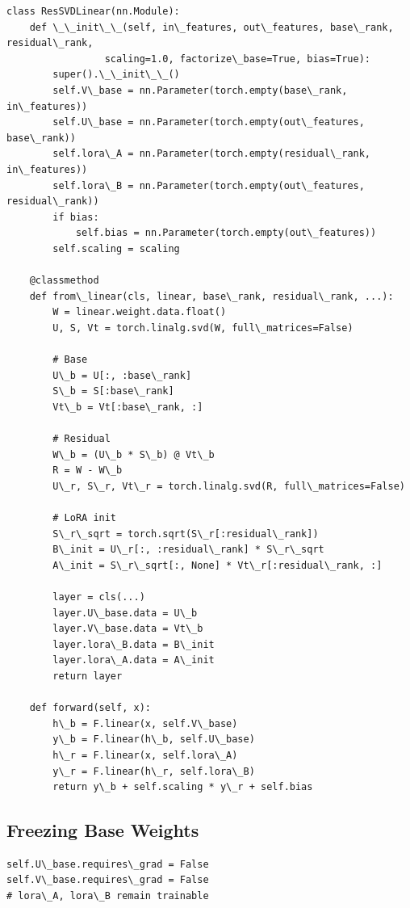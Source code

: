 \begin{lstlisting}
class ResSVDLinear(nn.Module):
    def \_\_init\_\_(self, in\_features, out\_features, base\_rank, residual\_rank,
                 scaling=1.0, factorize\_base=True, bias=True):
        super().\_\_init\_\_()
        self.V\_base = nn.Parameter(torch.empty(base\_rank, in\_features))
        self.U\_base = nn.Parameter(torch.empty(out\_features, base\_rank))
        self.lora\_A = nn.Parameter(torch.empty(residual\_rank, in\_features))
        self.lora\_B = nn.Parameter(torch.empty(out\_features, residual\_rank))
        if bias:
            self.bias = nn.Parameter(torch.empty(out\_features))
        self.scaling = scaling
    
    @classmethod
    def from\_linear(cls, linear, base\_rank, residual\_rank, ...):
        W = linear.weight.data.float()
        U, S, Vt = torch.linalg.svd(W, full\_matrices=False)
        
        # Base
        U\_b = U[:, :base\_rank]
        S\_b = S[:base\_rank]
        Vt\_b = Vt[:base\_rank, :]
        
        # Residual
        W\_b = (U\_b * S\_b) @ Vt\_b
        R = W - W\_b
        U\_r, S\_r, Vt\_r = torch.linalg.svd(R, full\_matrices=False)
        
        # LoRA init
        S\_r\_sqrt = torch.sqrt(S\_r[:residual\_rank])
        B\_init = U\_r[:, :residual\_rank] * S\_r\_sqrt
        A\_init = S\_r\_sqrt[:, None] * Vt\_r[:residual\_rank, :]
        
        layer = cls(...)
        layer.U\_base.data = U\_b
        layer.V\_base.data = Vt\_b
        layer.lora\_B.data = B\_init
        layer.lora\_A.data = A\_init
        return layer
    
    def forward(self, x):
        h\_b = F.linear(x, self.V\_base)
        y\_b = F.linear(h\_b, self.U\_base)
        h\_r = F.linear(x, self.lora\_A)
        y\_r = F.linear(h\_r, self.lora\_B)
        return y\_b + self.scaling * y\_r + self.bias
\end{lstlisting}

\subsection{Freezing Base Weights}

\begin{lstlisting}
self.U\_base.requires\_grad = False
self.V\_base.requires\_grad = False
# lora\_A, lora\_B remain trainable
\end{lstlisting}


